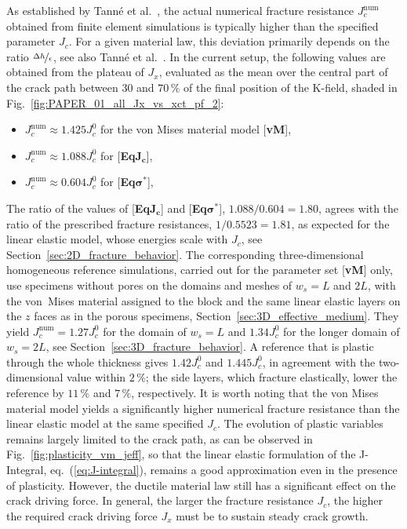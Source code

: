 \documentclass[pdflatex,sn-mathphys-num]{sn-jnl}%
\newcommand{\vMLabel}{[\textbf{vM}]\xspace}
\newcommand{\EqJcLabel}{[\textbf{Eq$\boldsymbol{J_c}$}]\xspace}
\newcommand{\EqSigmaStarLabel}{[\textbf{Eq$\boldsymbol{\sigma^*}$}]\xspace}
\theoremstyle{thmstyleone}%
\theoremstyle{thmstyletwo}%
\theoremstyle{thmstylethree}%
\begin{document}
As established by Tanné et al.~\cite{tanne_crack_2018}, the actual numerical fracture resistance $J_c^{\text{num}}$ obtained from finite element simulations is typically higher than the specified parameter $J_c$. For a given material law, this deviation primarily depends on the ratio $\nicefrac{\Delta{h}}{\epsilon}$, see also Tanné et al.~\cite{tanne_crack_2018}. In the current setup, the following values are obtained from the plateau of $J_x$, evaluated as the mean over the central part of the crack path between $30$ and $70\,\%$ of the final position of the K-field, shaded in Fig.~\ref{fig:PAPER_01_all_Jx_vs_xct_pf_2}:
\begin{itemize}
    \item $J_c^{\text{num}} \approx 1.425J_c^0$ for the von Mises material model \vMLabel,
    \item $J_c^{\text{num}} \approx 1.088J_c^0$ for \EqJcLabel,
    \item $J_c^{\text{num}} \approx 0.604J_c^0$ for \EqSigmaStarLabel,
\end{itemize}
The ratio of the values of \EqJcLabel and \EqSigmaStarLabel, $1.088/0.604 = 1.80$, agrees with the ratio of the prescribed fracture resistances, $1/0.5523 = 1.81$, as expected for the linear elastic model, whose energies scale with $J_c$, see Section~\ref{sec:2D_fracture_behavior}.
The corresponding three-dimensional homogeneous reference simulations, carried out for the parameter set \vMLabel only, use specimens without pores on the domains and meshes of $w_s = L$ and $2L$, with the von~Mises material assigned to the block and the same linear elastic layers on the $z$ faces as in the porous specimens, Section~\ref{sec:3D_effective_medium}. They yield $J_c^{\text{num}} = 1.27J_c^0$ for the domain of $w_s = L$ and $1.34J_c^0$ for the longer domain of $w_s = 2L$, see Section~\ref{sec:3D_fracture_behavior}. A reference that is plastic through the whole thickness gives $1.42J_c^0$ and $1.445J_c^0$, in agreement with the two-dimensional value within $2\,\%$; the side layers, which fracture elastically, lower the reference by $11\,\%$ and $7\,\%$, respectively.
It is worth noting that the von Mises material model yields a significantly higher numerical fracture resistance than the linear elastic model at the same specified $J_c$. The evolution of plastic variables remains largely limited to the crack path, as can be observed in Fig.~\ref{fig:plasticity_vm_jeff}, so that the linear elastic formulation of the J-Integral, eq.~(\ref{eq:J-integral}), remains a good approximation even in the presence of plasticity. However, the ductile material law still has a significant effect on the crack driving force. In general, the larger the fracture resistance $J_c$, the higher the required crack driving force $J_x$ must be to sustain steady crack growth.
\end{document}
